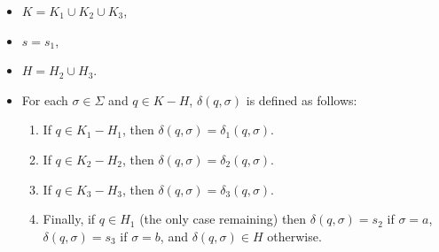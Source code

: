 \begin{itemize}[label={}]
  \item $K = K_1 \cup K_2 \cup K_3$,
  \item $s = s_1$,
  \item $H = H_2 \cup H_3$.
  \item For each $\sigma \in \Sigma$ and $q \in K - H$, $\delta(q, \sigma)$ is defined as follows:
    \begin{enumerate}[label=(\alph*)]
      \item If $q \in K_1 - H_1$, then $\delta(q, \sigma) = \delta_1(q, \sigma)$.
      \item If $q \in K_2 - H_2$, then $\delta(q, \sigma) = \delta_2(q, \sigma)$.
      \item If $q \in K_3 - H_3$, then $\delta(q, \sigma) = \delta_3(q, \sigma)$.
      \item Finally, if $q \in H_1$ (the only case remaining) then $\delta(q, \sigma) = s_2$ if $\sigma = a$, $\delta(q, \sigma) = s_3$ if $\sigma = b$, and $\delta(q, \sigma) \in H$ otherwise.
    \end{enumerate}
\end{itemize}

